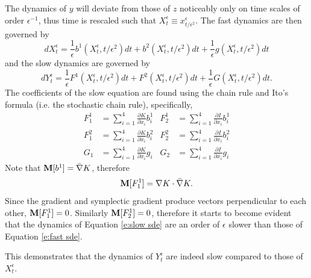 The dynamics of $y$ will deviate from those of $z$ noticeably only on time scales of order $\epsilon^{-1}$, thus time is rescaled such that $X^\epsilon_t \equiv x^\epsilon_{t/\epsilon^2}$. The fast dynamics are then governed by
\begin{equation}
\label{e:fast sde}
d X^\epsilon_t = \frac{1}{\epsilon} b^1 (X^\epsilon_t, t/\epsilon^2) dt + b^2 (X^\epsilon_t,t/\epsilon^2) dt + \frac{1}{\epsilon} g(X^\epsilon_t,t/\epsilon^2) dt
\end{equation}
and the slow dynamics are governed by
\begin{equation}
\label{e:slow sde}
dY^{\epsilon}_t = \frac{1}{\epsilon} F^1(X^\epsilon_t,t/\epsilon^2) dt + F^2(X^\epsilon_t,t/\epsilon^2) dt + \frac{1}{\epsilon} G(X^\epsilon_t,t/\epsilon^2) dt.
\end{equation}
The coefficients of the slow equation are found using the chain rule and Ito's formula (i.e. the stochastic chain rule), specifically,
\begin{equation}
\label{e:slow sde coefficients}
\begin{aligned}
F^1_1& = \sum^4_{i = 1} \frac{\partial K}{\partial x_i} b^1_i& F^1_2& = \sum^4_{i = 1} \frac{\partial I}{\partial x_i} b^1_i\\
F^2_1& = \sum^4_{i = 1} \frac{\partial K}{\partial x_i} b^2_i& F^2_2& = \sum^4_{i = 1} \frac{\partial I}{\partial x_i} b^2_i\\
G_1& = \sum^4_{i = 1} \frac{\partial K}{\partial x_i} g_i&
G_2& = \sum^4_{i = 1} \frac{\partial I}{\partial x_i} g_i
\end{aligned}
\end{equation}
Note that $\operatorname{\mathbf M}[b^1] = \bar \nabla K$, therefore
\[
\operatorname{\mathbf M}[F^1_1] = \nabla K \cdot \bar \nabla K.
\]
Since the gradient and symplectic gradient produce vectors perpendicular to each other, $\operatorname{\mathbf M}[F^1_1] = 0$. Similarly $\operatorname{\mathbf M}[F^1_2] = 0$, therefore it starts to become evident that the dynamics of Equation \eqref{e:slow sde} are an order of $\epsilon$ slower than those of Equation \eqref{e:fast sde}.

This demonstrates that the dynamics of $Y_t^\epsilon$ are indeed slow compared to those of $X_t^\epsilon$.

